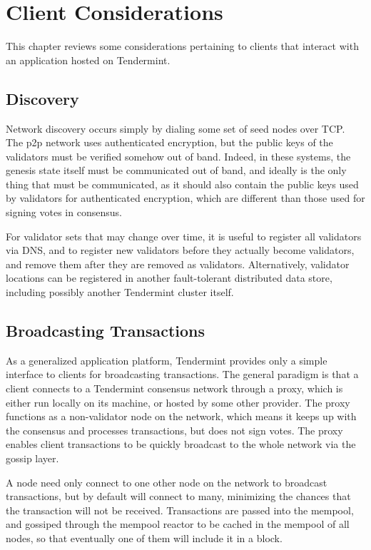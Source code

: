 \chapter{Client Considerations}
\label{ch:clients}

This chapter reviews some considerations pertaining to clients that interact with an application hosted on Tendermint.

\section{Discovery}

Network discovery occurs simply by dialing some set of seed nodes over TCP.
The p2p network uses authenticated encryption, but the public keys of the validators must be verified somehow out of band.
Indeed, in these systems, the genesis state itself must be communicated out of band, and ideally is the only thing that must be communicated, 
as it should also contain the public keys used by validators for authenticated encryption, 
which are different than those used for signing votes in consensus.

For validator sets that may change over time, it is useful to register all validators via DNS, 
and to register new validators before they actually become validators, and remove them after they are removed as validators.
Alternatively, validator locations can be registered in another fault-tolerant distributed data store, 
including possibly another Tendermint cluster itself.

\section{Broadcasting Transactions}

As a generalized application platform, Tendermint provides only a simple interface to clients for broadcasting transactions.
The general paradigm is that a client connects to a Tendermint consensus network through a proxy, which is either run locally on its machine,
or hosted by some other provider. The proxy functions as a non-validator node on the network, 
which means it keeps up with the consensus and processes transactions, but does not sign votes.
The proxy enables client transactions to be quickly broadcast to the whole network via the gossip layer.

A node need only connect to one other node on the network to broadcast transactions, but by default will connect to many,
minimizing the chances that the transaction will not be received.
Transactions are passed into the mempool, 
and gossiped through the mempool reactor to be cached in the mempool of all nodes, 
so that eventually one of them will include it in a block. 

